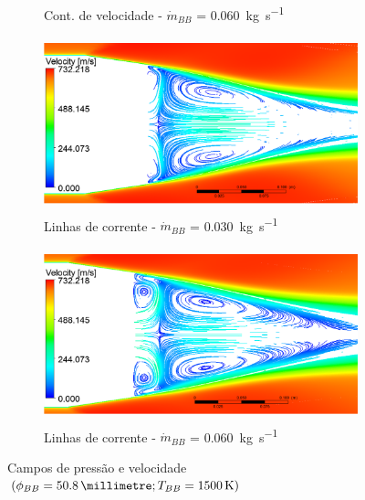 \begin{figure}[!htpb]
\begin{subfigure}[b]{0.47\textwidth}
        \caption{Cont. de velocidade - \(\Dot{m}_{BB}\) = \qty{0,060}{\kilogram\per\second}}
        \label{fig:contorno-velocidade-bb-1500K-vazao0060}
    \end{subfigure}
    \hfill
    \begin{subfigure}[b]{0.47\textwidth} %
        \centering
        \includegraphics[height=5cm,width=\textwidth]{corrente-velocidade-2306K-vazao-0030-2pol.png}
        \caption{Linhas de corrente - \(\Dot{m}_{BB}\) = \qty{0,030}{\kilogram\per\second}}
        \label{fig:corrente-velocidade-bb-1500K-vazao0030}
    \end{subfigure}
    \hfill
    \begin{subfigure}[b]{0.47\textwidth} %
        \centering
        \includegraphics[height=5cm,width=\textwidth]{corrente-velocidade-2306K-vazao-0060-2pol.png}
        \caption{Linhas de corrente - \(\Dot{m}_{BB}\) = \qty{0,060}{\kilogram\per\second}}
        \label{fig:corrente-velocidade-bb-1500K-vazao0060}
    \end{subfigure}
    \caption{Campos de pressão e velocidade \(\left(\phi_{BB} = \qty{50,8}{\millimetre}; T_{BB} = \qty{1500}{\kelvin}\right)\)}
	\label{fig:influencia-vazao-bb}
\end{figure}


